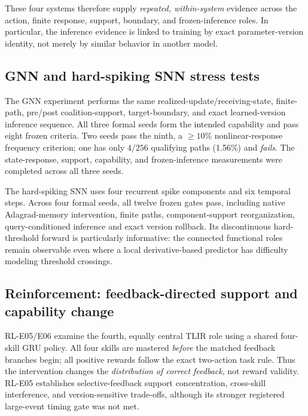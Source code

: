 \documentclass[conference,10pt]{IEEEtran}
\begin{document}
These four systems therefore supply \emph{repeated, within-system} evidence across the action, finite response, support, boundary, and frozen-inference roles. In particular, the inference evidence is linked to training by exact parameter-version identity, not merely by similar behavior in another model.

\subsection{GNN and hard-spiking SNN stress tests}
The GNN experiment performs the same realized-update/receiving-state, finite-path, pre/post coalition-support, target-boundary, and exact learned-version inference sequence. All three formal seeds form the intended capability and pass eight frozen criteria. Two seeds pass the ninth, a $\geq 10\%$ nonlinear-response frequency criterion; one has only $4/256$ qualifying paths (1.56\%) and \emph{fails}. The state-response, support, capability, and frozen-inference measurements were completed across all three seeds.

The hard-spiking SNN uses four recurrent spike components and six temporal steps. Across four formal seeds, all twelve frozen gates pass, including native Adagrad-memory intervention, finite paths, component-support reorganization, query-conditioned inference and exact version rollback. Its discontinuous hard-threshold forward is particularly informative: the connected functional roles remain observable even where a local derivative-based predictor has difficulty modeling threshold crossings. 

\subsection{Reinforcement: feedback-directed support and capability change}
RL-E05/E06 examine the fourth, equally central TLIR role using a shared four-skill GRU policy. All four skills are mastered \emph{before} the matched feedback branches begin; all positive rewards follow the exact two-action task rule. Thus the intervention changes the \emph{distribution of correct feedback}, not reward validity. RL-E05 establishes selective-feedback support concentration, cross-skill interference, and version-sensitive trade-offs, although its stronger registered large-event timing gate was not met.
\end{document}
